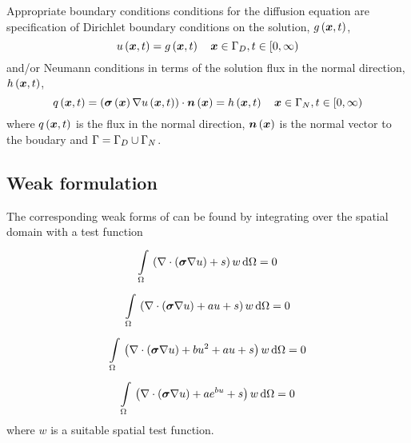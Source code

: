 Appropriate boundary conditions conditions for the diffusion
equation are specification of Dirichlet boundary conditions on the solution,
$ g\left(  \boldsymbol{x} ,t \right) $, \ie
\begin{equation}
  \fnof{u}{\vectr{x},t} = \fnof{g}{\vectr{x},t} \quad \vectr{x}\in\Gamma_{D},t\in[0,\infty)
  \label{eqn:PoissonDirichletBC} 
\end{equation}
and/or Neumann conditions in terms of the solution flux in the normal
direction, $ h\left(  \boldsymbol{x} ,t \right) $, \ie
\begin{equation}
  \fnof{q}{\vectr{x},t} = \dotprod{\pbrac{\fnof{\tensor{\sigma}}{\vectr{x}}
      \gradient{}{\fnof{u}{\vectr{x},t}}}}{\fnof{\normal}{\vectr{x}}} =
  \fnof{h}{\vectr{x},t} \quad \vectr{x}\in\Gamma_{N},t\in[0,\infty)
  \label{eqn:PoissonNeumannBC} 
\end{equation}
where $ q\left(  \boldsymbol{x} ,t \right) $ is the flux in the normal direction, $  \boldsymbol{n} \left(  \boldsymbol{x}  \right) $ is the normal
vector to the boudary and $\Gamma=\Gamma_{D}\cup\Gamma_{N}$.

\subsection{Weak formulation}

The corresponding weak forms of  can be found by
integrating over the spatial domain with a test function \ie
\begin{equation}
  \gint{\Omega}{}{\pbrac{\divergence{}{\pbrac{\tensor{\sigma}\gradient{}{u}}}+s}w}{\Omega}=0
  \label{eqn:GeneralPoissonWeakForm1}
\end{equation}
\begin{equation}
  \gint{\Omega}{}{\pbrac{\divergence{}{\pbrac{\tensor{\sigma}\gradient{}{u}}}+au+s}w}{\Omega}=0
  \label{eqn:LinearSourcePoissonWeakForm1}
\end{equation}
\begin{equation}
  \gint{\Omega}{}{\pbrac{\divergence{}{\pbrac{\tensor{\sigma}\gradient{}{u}}}+bu^{2}+au+s}w}{\Omega}=0
  \label{eqn:QuadraticSourcePoissonWeakForm1}
\end{equation}
\begin{equation}
  \gint{\Omega}{}{\pbrac{\divergence{}{\pbrac{\tensor{\sigma}\gradient{}{u}}}+ae^{bu}+s}w}{\Omega}=0
  \label{eqn:ExponentialSourcePoissonWeakForm1}
\end{equation}
where $w$ is a suitable spatial test function.

